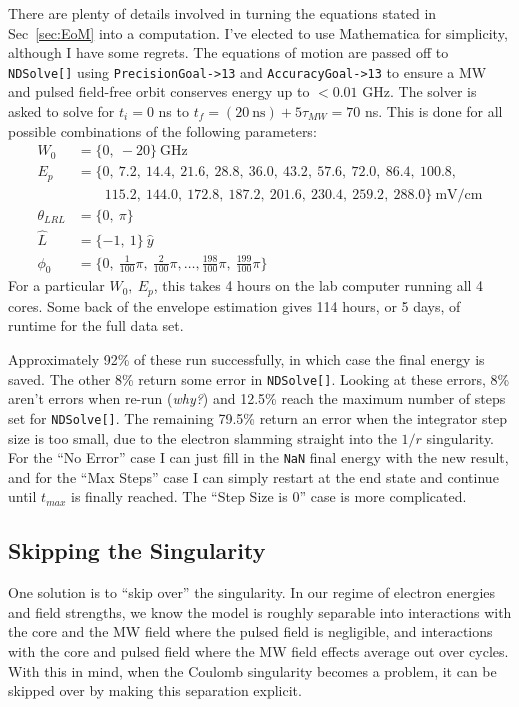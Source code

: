 \documentclass[aps,pra,preprint,groupedaddress]{revtex4-1}
\begin{document}
There are plenty of details involved in turning the equations stated in Sec~\ref{sec:EoM} into a computation. I've elected to use Mathematica for simplicity, although I have some regrets. The equations of motion are passed off to \texttt{NDSolve[]} using \texttt{PrecisionGoal->13} and \texttt{AccuracyGoal->13} to ensure a MW and pulsed field-free orbit conserves energy up to $< 0.01$ GHz. The solver is asked to solve for $t_i = 0$ ns to $t_f = (20~\text{ns}) + 5\tau_{MW} = 70$ ns. This is done for all possible combinations of the following parameters:
\begin{align*}
W_0 & = \{0,~ -20\}~\text{GHz} \\
E_p & = \{0,~ 7.2,~ 14.4,~ 21.6,~ 28.8,~ 36.0,~ 43.2,~ 57.6,~ 72.0,~ 86.4,~ 100.8,~ \\
 & \quad \quad 115.2,~ 144.0,~ 172.8,~ 187.2,~ 201.6,~ 230.4,~ 259.2,~ 288.0\}~\text{mV/cm} \\
\theta_{LRL} & = \{0,~ \pi\} \\
\hat{L} & = \{-1,~ 1\}~\hat{y} \\
\phi_0 & = \{0,~ \frac{1}{100} \pi,~ \frac{2}{100} \pi, \ldots, \frac{198}{100} \pi,~ \frac{199}{100} \pi\}
\end{align*}
For a particular $W_0,~ E_p$, this takes 4 hours on the lab computer running all 4 cores. Some back of the envelope estimation gives 114 hours, or 5 days, of runtime for the full data set.

Approximately 92\% of these run successfully, in which case the final energy is saved. The other 8\% return some error in \texttt{NDSolve[]}. Looking at these errors, 8\% aren't errors when re-run (\emph{why?}) and 12.5\% reach the maximum number of steps set for \texttt{NDSolve[]}. The remaining 79.5\% return an error when the integrator step size is too small, due to the electron slamming straight into the $1/r$ singularity. For the ``No Error'' case I can just fill in the \texttt{NaN} final energy with the new result, and for the ``Max Steps'' case I can simply restart at the end state and continue until $t_{max}$ is finally reached. The ``Step Size is 0'' case is more complicated.

\subsection{\label{sec:ssing} Skipping the Singularity}

One solution is to ``skip over'' the singularity. In our regime of electron energies and field strengths, we know the model is roughly separable into interactions with the core and the MW field where the pulsed field is negligible, and interactions with the core and pulsed field where the MW field effects average out over cycles. With this in mind, when the Coulomb singularity becomes a problem, it can be skipped over by making this separation explicit.
\end{document}
